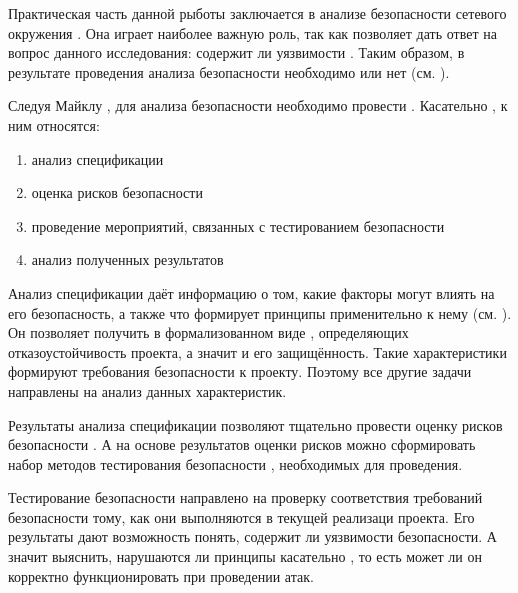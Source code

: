 %
Практическая часть данной рыботы заключается в анализе безопасности сетевого окружения . 
%
Она играет наиболее важную роль, так как позволяет дать ответ на вопрос данного исследования: содержит ли  уязвимости . 
%
Таким образом, в результате проведения анализа безопасности  необходимо  или нет (см. ). 

%
Следуя Майклу , для анализа безопасности  необходимо провести . 
%
Касательно , к ним относятся:
\begin{enumerate}
	\leftskip2em%
	\setlength{\itemsep}{0pt}%
	\setlength{\parsep}{0pt}%

	\item анализ спецификации
	\item оценка рисков безопасности
	\item проведение мероприятий, связанных с тестированием безопасности
	\item анализ полученных результатов
\end{enumerate} 

%
%
%

%
Анализ спецификации  даёт информацию о том, какие факторы могут влиять на его безопасность, а также что формирует принципы  применительно к нему (см. ). 
%
Он позволяет получить в формализованном виде , определяющих отказоустойчивость проекта, а значит и его защищённость. 
%
Такие характеристики формируют требования безопасности к проекту. 
%
Поэтому все другие задачи направлены на анализ данных характеристик. 

%
Результаты анализа спецификации позволяют тщательно провести оценку рисков безопасности . 
%
А на основе результатов оценки рисков можно сформировать набор методов тестирования безопасности , необходимых для проведения. 

%
Тестирование безопасности  направлено на проверку соответствия требований безопасности тому, как они выполняются в текущей реализаци проекта. 
%
Его результаты дают возможность понять, содержит ли  уязвимости безопасности. 
%
А значит выяснить, нарушаются ли принципы  касательно , то есть может ли он корректно функционировать при проведении атак.